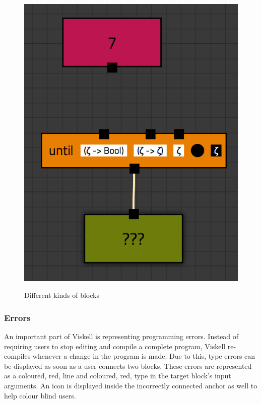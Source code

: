 \begin{figure}[p]
	\centering
	\includegraphics[scale=0.5]{Images/blocks-example}
	\label{fig:blocks-example}
	\caption{Different kinds of blocks}
\end{figure}


\subsubsection{Errors}

An important part of Viskell is representing programming errors.
Instead of requiring users to stop editing and compile a complete program, Viskell re-compiles whenever a change in the program is made. Due to this, type errors can be displayed as soon as a user connects two blocks. These errors are represented as a coloured, red, line and coloured, red, type in the target block's input arguments. An icon is displayed inside the incorrectly connected anchor as well to help colour blind users.

